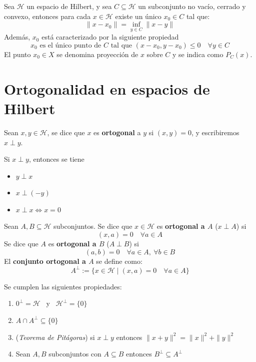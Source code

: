 \documentclass[12pt]{book}
\begin{document}
\begin{teo}
    Sea $\mathcal{H}$ un espacio de Hilbert, y sea $C \subseteq \mathcal{H}$ un subconjunto no vacío, cerrado y convexo, entonces para cada $x \in \mathcal{H}$ existe un único $x_0 \in C$ tal que:
    \[ \|x - x_0\| = \inf_{y \in C} \|x - y\| \]
    Además, $x_0$ está caracterizado por la siguiente propiedad
    \begin{equation*}
        x_0 \text{ es el único punto de } C \text{ tal que } (x - x_0, y - x_0) \le 0 \quad \forall y \in C
    \end{equation*}
    El punto $x_0 \in X$ se denomina proyección de $x$ sobre $C$ y se indica como $P_C(x)$.
\end{teo}


\section{Ortogonalidad en espacios de Hilbert}

\begin{definicion}
    Sean $x, y \in \mathcal{H}$, se dice que $x$ es \textbf{ortogonal} a $y$ si $(x, y) = 0$, y escribiremos $x \perp y$.
\end{definicion}

\begin{prop}
    Si $x \perp y$, entonces se tiene 
    \begin{itemize}
        \item[i)] $y \perp x$
        \item[ii)] $x \perp (-y)$
        \item[iii)] $x \perp x \iff x = 0$
    \end{itemize}
\end{prop}

\begin{definicion}
    Sean $A, B \subseteq \mathcal{H}$ subconjuntos. Se dice que $x \in \mathcal{H}$ es \textbf{ortogonal a $A$} ($x \perp A$) si 
    $$(x, a) = 0 \quad \forall a \in A$$ 
    \noindent
    Se dice que $A$ es \textbf{ortogonal a $B$} ($A \perp B$) si 
    $$(a, b) = 0 \quad \forall a \in A, \ \forall b \in B$$ 
    \noindent
    El \textbf{conjunto ortogonal a $A$} se define como:
    \[ A^\perp := \{ x \in \mathcal{H} \mid (x, a) = 0 \quad \forall a \in A \} \]
\end{definicion}

\begin{prop}\label{prop:ortogonalidad}
    Se cumplen las siguientes propiedades:
    \begin{enumerate}
        \item $0^{\perp} = \mathcal{H}$ \ y \ $\mathcal{H}^{\perp} = \{0\}$
        \item $A \cap A^{\perp} \subseteq \{0\}$
        \item (\textit{Teorema de Pitágoras}) si $x \perp y$ entonces $\|x + y\|^2 = \|x\|^2 + \|y\|^2$
        \item Sean $A, B$ subconjuntos con $A \subseteq B$ entonces $B^{\perp}\subseteq A^{\perp}$
    \end{enumerate}
\end{prop}
\end{document}
